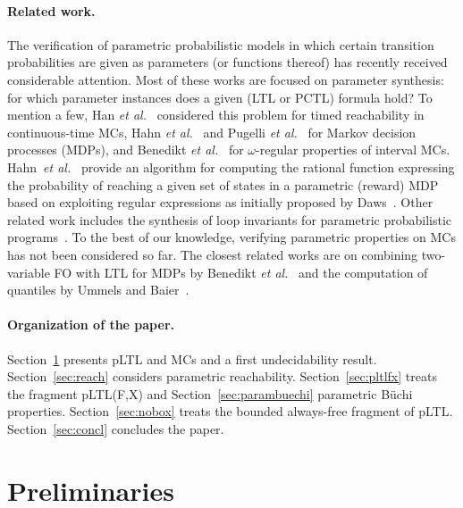 \documentclass{llncs}
\begin{document}
\paragraph{Related work.}
The verification of parametric probabilistic models in which certain transition probabilities are given as parameters (or functions thereof) has recently received 
considerable attention.
Most of these works are focused on parameter synthesis: for which parameter instances does a given (LTL or PCTL) formula hold?
To mention a few, Han \emph{et al.}~\cite{DBLP:conf/rtss/HanKM08} considered this problem for timed reachability in continuous-time MCs, Hahn \emph{et al.}~\cite{DBLP:conf/nfm/HahnHZ11} and
Pugelli \emph{et al.}~\cite{DBLP:conf/cav/Pugelli13} for Markov decision processes (MDPs), and Benedikt \emph{et al.}~\cite{DBLP:conf/tacas/BenediktLW13} for $\omega$-regular properties of interval MCs.
Hahn~\emph{et al.}~\cite{DBLP:journals/sttt/HahnHZ11} provide an algorithm for computing the rational function expressing the probability of reaching a given set of states in a parametric (reward) MDP based on exploiting regular expressions as initially proposed by Daws~\cite{DBLP:conf/ictac/Daws04}.
Other related work includes the synthesis of loop invariants for parametric probabilistic programs~\cite{DBLP:conf/sas/KatoenMMM10}.
To the best of our knowledge, verifying parametric properties on MCs has not been considered so far.
The closest related works are on combining two-variable FO with LTL for MDPs by Benedikt \emph{et al.}~\cite{DBLP:journals/corr/abs-1303-4533} and 
the computation of quantiles by Ummels and Baier~\cite{DBLP:conf/fossacs/UmmelsB13}.  

\paragraph{Organization of the paper.}
Section~\ref{sec:prelim} presents pLTL and MCs and a first undecidability result.
Section~\ref{sec:reach} considers parametric reachability.
Section~\ref{sec:pltlfx} treats the fragment pLTL(F,X) and
Section~\ref{sec:parambuechi} parametric B\"uchi properties.  
Section~\ref{sec:nobox}  treats the bounded always-free fragment of pLTL. 
Section~\ref{sec:concl} concludes the paper. \\[-3ex]

\section{Preliminaries}
\label{sec:prelim}
\vspace{-0.3cm}
\end{document}
